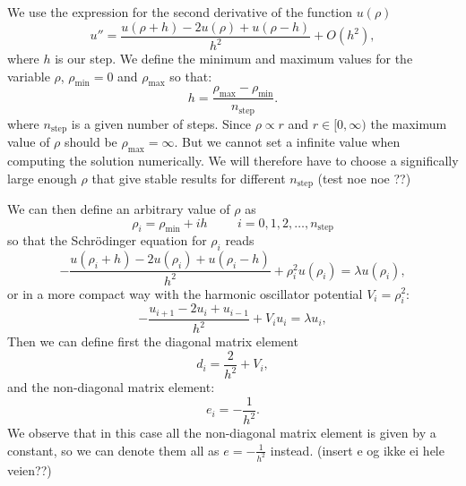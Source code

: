 \documentclass[11pt,a4wide]{article}
\begin{document}
We use the expression for the second derivative of the function $u(\rho)$
\begin{equation}
    u''=\frac{u(\rho+h) -2u(\rho) +u(\rho-h)}{h^2} +O(h^2),
    \label{eq:diffoperation}
\end{equation} 
where $h$ is our step. We define the minimum and maximum values for the variable $\rho$,
$\rho_{\mathrm{min}}=0$  and $\rho_{\mathrm{max}}$ so that:
\[
  h=\frac{\rho_{\mathrm{max}}-\rho_{\mathrm{min}} }{n_{\mathrm{step}}}.
\]
where $n_{\mathrm{step}}$ is a given number of steps. Since $\rho \propto r$ and $r\in [0,\infty)$ the maximum value of $\rho$ should be $\rho_{\mathrm{max}}=\infty$. But we cannot set a infinite value when computing the solution numerically. We will therefore have to choose a significally large enough $\rho$ that give stable results for different $n_{\mathrm{step}}$ (test noe noe ??)

We can then define an arbitrary value of $\rho$ as 
\[
    \rho_i= \rho_{\mathrm{min}} + ih \hspace{1cm} i=0,1,2,\dots , n_{\mathrm{step}}
\]
so that the Schr\"odinger equation for $\rho_i$ reads
\[
-\frac{u(\rho_i+h) -2u(\rho_i) +u(\rho_i-h)}{h^2}+\rho_i^2u(\rho_i)  = \lambda u(\rho_i),
\]
or in a more compact way with the harmonic oscillator potential $V_i=\rho_i^2$:
\begin{equation}
-\frac{u_{i+1} -2u_i +u_{i-1} }{h^2}+V_iu_i  = \lambda u_i,
\label{eq: sch_discrete_first}
\end{equation}
Then we can define first the diagonal matrix element
\[
   d_i=\frac{2}{h^2}+V_i,
\]
and the non-diagonal matrix element:
\[
   e_i=-\frac{1}{h^2}.
\]
We observe that in this case all the non-diagonal matrix element is given by a constant, so we can denote them all as $e=-\frac{1}{h^2}$ instead. (insert e og ikke ei hele veien??)
 
\end{document}
